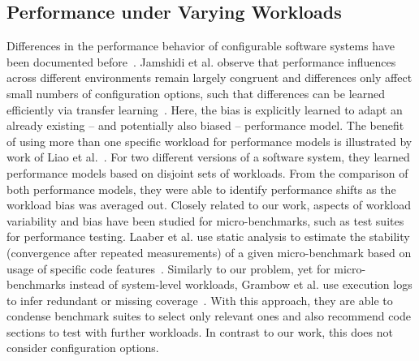 \subsection{Performance under Varying Workloads}
Differences in the performance behavior of configurable software systems have been documented before~\cite{jamishidi_transfer_2017,alves_sampling_2020}. Jamshidi et al. observe that performance influences across different environments remain largely congruent and differences only affect small numbers of configuration options, such that differences can be learned efficiently via transfer learning~\cite{jamishidi_transfer_2017,jamshidi_learning_2018,jamshidi_transfer_gp_2017,ding_bayesian_2020}. Here, the bias is explicitly learned to adapt an already existing – and potentially also biased -- performance model. The benefit of using more than one specific workload for performance models is illustrated by work of Liao et al.~\cite{liao_2020_using_emse}. For two different versions of a software system, they learned performance models based on disjoint sets of workloads. From the comparison of both performance models, they were able to identify performance shifts as the workload bias was averaged out.
Closely related to our work, aspects of workload variability and bias have been studied for micro-benchmarks, such as test suites for performance testing. Laaber et al. use static analysis to estimate the stability (convergence after repeated measurements) of a given micro-benchmark based on usage of specific code features~\cite{laaber_emse_2021}. Similarly to our problem, yet for micro-benchmarks instead of system-level workloads, Grambow et al. use execution logs to infer redundant or missing coverage~\cite{grambow_peerj_2021}. With this approach, they are able to condense benchmark suites to select only relevant ones and also recommend code sections to test with further workloads. In contrast to our work, this does not consider configuration options.


